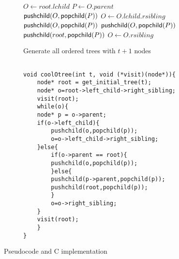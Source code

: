 \begin{figure}
    \centering
    \begin{subfigure}[t]{.49 \textwidth}
	\begin{center}
	    \begin{algorithm}[H] %
	    \begin{algorithmic}
	\State $O\gets root.lchild$
	\State {}
	    \State $P \gets O.parent$
		\State $\mathsf{pushchild(} O, \mathsf{popchild(} P \mathsf{)} \mathsf{)}$
		\State $O \gets O.lchild.rsibling$
	    \Else
		\State $\mathsf{pushchild(} O, \mathsf{popchild(} P \mathsf{)} \mathsf{)}$
		\Else
		\State $\mathsf{pushchild(} O, \mathsf{popchild(} P \mathsf{)} \mathsf{)}$
		\State $\mathsf{pushchild(} root, \mathsf{popchild(} P \mathsf{)} \mathsf{)}$
		\EndIf
		\State $O \gets O.rsibling$
	    \EndIf
	\State {}
        \EndWhile
    \EndFunction
	    \end{algorithmic}
    \caption*{Generate all ordered trees with $t+1$ nodes}
	\end{algorithm}
	\end{center}
	\label{fig:}
    \end{subfigure}
    \begin{subfigure}[t]{.5 \textwidth}
	\begin{center}
	    \vspace{.9em} %
\begin{Verbatim}[commandchars=\\\[\]]

void coolOtree(int t, void (*visit)(node*)){
    node* root = get_initial_tree(t);
    node* o=root->left_child->right_sibling;
    visit(root);
    while(o){
	node* p = o->parent;
	if(o->left_child){ 
	    pushchild(o,popchild(p));
	    o=o->left_child->right_sibling;
	}else{
	    if(o->parent == root){ 
		pushchild(o,popchild(p));
	    }else{ 
		pushchild(p->parent,popchild(p));
		pushchild(root,popchild(p));
	    }
	    o=o->right_sibling;
	}
	visit(root);
    }
}
\end{Verbatim}
	\end{center}
	\label{fig:}
    \end{subfigure}

    \cprotect\caption{Pseudocode and C implementation}
    \label{fig:otreeCode}
\end{figure}
